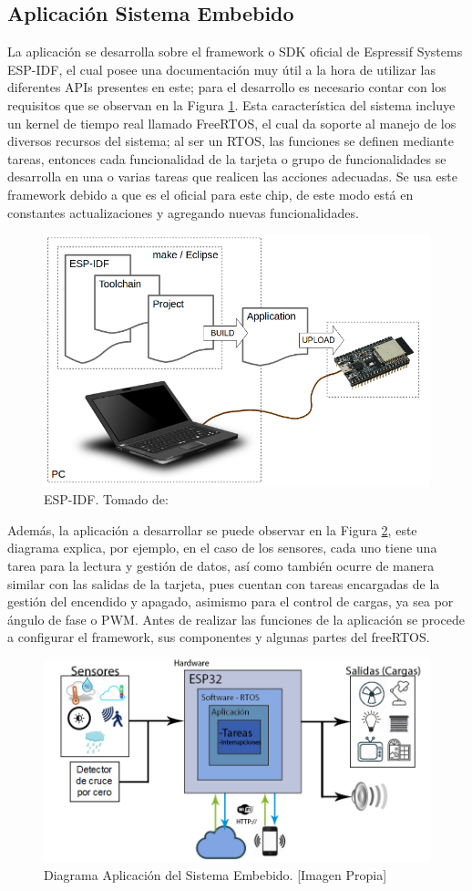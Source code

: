 \subsection{Aplicación Sistema Embebido}
La aplicación se desarrolla sobre el framework o SDK oficial de Espressif Systems ESP-IDF, el cual posee una documentación \cite{ES} muy útil a la hora de utilizar las diferentes APIs presentes en este; para el desarrollo es necesario contar con los requisitos que se observan en la Figura \ref{fig:what-you-need}. Esta característica del sistema incluye un kernel de tiempo real llamado FreeRTOS, el cual da soporte al manejo de los diversos recursos del sistema; al ser un RTOS, las funciones se definen mediante tareas, entonces cada funcionalidad de la tarjeta o grupo de funcionalidades se desarrolla en una o varias tareas que realicen las acciones adecuadas. Se usa este framework debido a que es el oficial para este chip, de este modo está en constantes actualizaciones y agregando nuevas funcionalidades.\\

\begin{figure}[H]
	\centering
	\caption[ESP-IDF.]{ESP-IDF. Tomado de: \cite{ES}}
	\label{fig:what-you-need}
	\includegraphics[width=0.5\linewidth]{Imagenes/what-you-need}
\end{figure}

Además, la aplicación a desarrollar se puede observar en la Figura \ref{fig:App}, este diagrama explica, por ejemplo, en el caso de los sensores, cada uno tiene una tarea para la lectura y gestión de datos, así como también ocurre de manera similar con las salidas de la tarjeta, pues cuentan con tareas encargadas de la gestión del encendido y apagado, asimismo para el control de cargas, ya sea por ángulo de fase o PWM. Antes de realizar las funciones de la aplicación se procede a configurar el framework, sus componentes y algunas partes del freeRTOS.\\

\begin{figure}[H]
	\centering
	\caption[Diagrama Aplicación del Sistema Embebido.]{Diagrama Aplicación del Sistema Embebido. [Imagen Propia]}
	\label{fig:App}
	\includegraphics[width=0.7\linewidth]{Imagenes/B_Aplicacion}
\end{figure}

